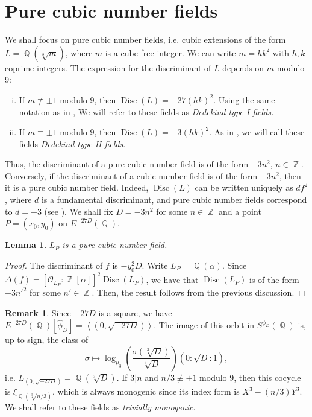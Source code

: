 \documentclass[oneside]{amsart}
\newcommand{\scprod}[1]{\left\langle #1 \right\rangle}
\newcommand{\embrace}[3]{\left#1 #3 \right#2}
\newcommand{\lpar}[1]{\embrace{(}{)}{#1}}
\DeclareMathOperator{\disc}{Disc}
\DeclareMathOperator{\QQ}{\mathbb{Q}}
\DeclareMathOperator{\ZZ}{\mathbb{Z}}
\newtheorem{lemma}[X]{Lemma}
\theoremstyle{definition}
\newtheorem{remark}[X]{Remark}
\begin{document}
\section{Pure cubic number fields}
\label{section: pure cubic number fields}
We shall focus on pure cubic number fields, i.e. cubic extensions of the form $L = \QQ(\sqrt[3]{m})$, where $m$ is a cube-free integer. We can write $m = hk^2$ with $h, k$ coprime integers. The expression for the discriminant of $L$ depends on $m$ modulo 9:
\begin{enumerate}[(i)]
    \item If $m \not \equiv \pm 1$ modulo 9, then $\disc(L) = -27(hk)^2$. Using the same notation as in \cite[\S 5]{BARRUCAND19707}, We will refer to these fields as \textit{Dedekind type I fields.}
    \item If $m \equiv \pm 1$ modulo 9, then $\disc(L) = -3(hk)^2$. As in \cite[\S 5]{BARRUCAND19707}, we will call these fields \textit{Dedekind type II fields}.
\end{enumerate}
Thus, the discriminant of a pure cubic number field is of the form $-3n^2$, $n \in \ZZ$. Conversely, if the discriminant of a cubic number field is of the form $-3n^2$, then it is a pure cubic number field. Indeed, $\disc(L)$ can be written uniquely as $df^2$, where $d$ is a fundamental discriminant, and pure cubic number fields correspond to $d = -3$ (see \cite[\S 6.4.5]{Cohen}). We shall fix $D = -3n^2$ for some $n \in \ZZ$ and a point $P = (x_0, y_0)$ on $E^{-27D}(\QQ)$.

\begin{lemma}
    \label{lemma: cocycle pure field}
    $L_P$ is a pure cubic number field.
\end{lemma}
\begin{proof}
    The discriminant of $f$ is $-y_0^2D$. Write $L_P = \QQ(\alpha)$. Since $\Delta(f) = [\mathcal{O}_{L_P}:\ZZ[\alpha]]^2\disc(L_P)$, we have that $\disc(L_P)$ is of the form $-3n'^2$ for some $n' \in \ZZ$. Then, the result follows from the previous discussion.
\end{proof}
\begin{remark}
    \label{remark: Trivially mono}
    Since $-27D$ is a square, we have $E^{-27D}(\QQ)[\hat{\phi}_D] = \scprod{(0, \sqrt{-27D})}$. The image of this orbit in $S^{\phi_D}(\QQ)$ is, up to sign, the class of  
    $$
    \sigma \mapsto \log_{\mu_3}\lpar{\frac{\sigma(\sqrt[3]{D})}{\sqrt[3]{D}}}(0:\sqrt{D}:1), 
    $$
    i.e. $L_{(0, \sqrt{-27D})} = \QQ(\sqrt[3]{D})$. If $3|n$ and $n/3 \not \equiv \pm 1$ modulo 9, then this cocycle is $\xi_{\QQ(\sqrt[3]{n/3})}$, which is always monogenic since its index form is $X^3 - (n/3)Y^3$. We shall refer to these fields as \textit{trivially monogenic}.
\end{remark}
\end{document}
